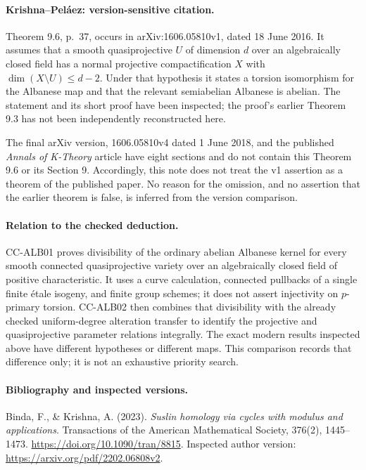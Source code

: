 \paragraph{Krishna--Pel\'aez: version-sensitive citation.}
Theorem 9.6, p.~37, occurs in arXiv:1606.05810v1, dated 18 June 2016.
It assumes that a smooth quasiprojective \(U\) of dimension \(d\) over
an algebraically closed field has a normal projective compactification
\(X\) with \(\dim(X\setminus U)\le d-2\). Under that hypothesis it
states a torsion isomorphism for the Albanese map and that the relevant
semiabelian Albanese is abelian. The statement and its short proof
have been inspected; the proof's earlier Theorem 9.3 has not been
independently reconstructed here.

The final arXiv version, 1606.05810v4 dated 1 June 2018, and the
published \emph{Annals of K-Theory} article have eight sections and do
not contain this Theorem 9.6 or its Section 9. Accordingly, this note
does not treat the v1 assertion as a theorem of the published paper.
No reason for the omission, and no assertion that the earlier theorem
is false, is inferred from the version comparison.

\paragraph{Relation to the checked deduction.}
CC-ALB01 proves divisibility of the ordinary abelian Albanese kernel
for every smooth connected quasiprojective variety over an
algebraically closed field of positive characteristic. It uses a
curve calculation, connected pullbacks of a single finite \'etale
isogeny, and finite group schemes; it does not assert injectivity on
\(p\)-primary torsion. CC-ALB02 then combines that divisibility with
the already checked uniform-degree alteration transfer to identify
the projective and quasiprojective parameter relations integrally.
The exact modern results inspected above have different hypotheses
or different maps. This comparison records that difference only;
it is not an exhaustive priority search.

\paragraph{Bibliography and inspected versions.}
Binda, F., \& Krishna, A. (2023).
\emph{Suslin homology via cycles with modulus and applications}.
Transactions of the American Mathematical Society, 376(2), 1445--1473.
\url{https://doi.org/10.1090/tran/8815}.
Inspected author version:
\url{https://arxiv.org/pdf/2202.06808v2}.

